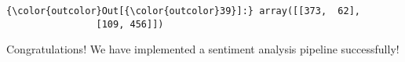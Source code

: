 \documentclass[11pt]{article}
\begin{document}
\begin{Verbatim}[commandchars=\\\{\}]
{\color{outcolor}Out[{\color{outcolor}39}]:} array([[373,  62],
                [109, 456]])
\end{Verbatim}
            
    Congratulations! We have implemented a sentiment analysis pipeline
successfully!


    
    
    
    
\end{document}
